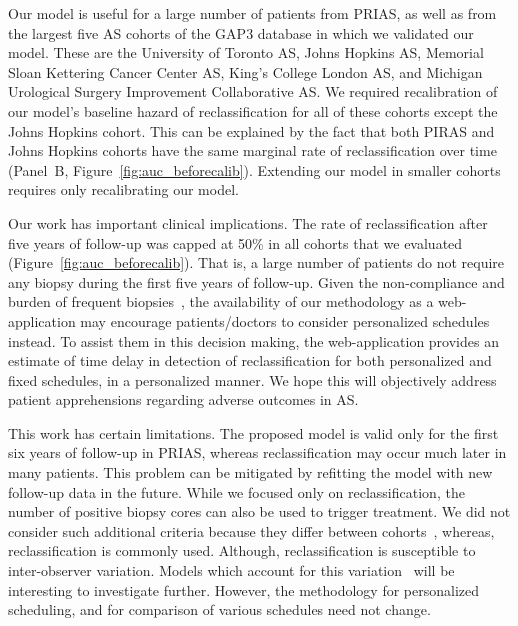 Our model is useful for a large number of patients from PRIAS, as well as from the largest five AS cohorts of the GAP3 database in which we validated our model. These are the University of Toronto AS, Johns Hopkins AS, Memorial Sloan Kettering Cancer Center AS, King's College London AS, and Michigan Urological Surgery Improvement Collaborative AS. We required recalibration of our model's baseline hazard of reclassification for all of these cohorts except the Johns Hopkins cohort. This can be explained by the fact that both PIRAS and Johns Hopkins cohorts have the same marginal rate of reclassification over time (Panel~B, Figure~\ref{fig:auc_beforecalib}). Extending our model in smaller cohorts requires only recalibrating our model.

Our work has important clinical implications. The rate of reclassification after five years of follow-up was capped at 50\% in all cohorts that we evaluated (Figure~\ref{fig:auc_beforecalib}). That is, a large number of patients do not require any biopsy during the first five years of follow-up. Given the non-compliance and burden of frequent biopsies~\citep{bokhorst2015compliance}, the availability of our methodology as a web-application may encourage patients/doctors to consider personalized schedules instead. To assist them in this decision making, the web-application provides an estimate of time delay in detection of reclassification for both personalized and fixed schedules, in a personalized manner. We hope this will objectively address patient apprehensions regarding adverse outcomes in AS.

This work has certain limitations. The proposed model is valid only for the first six years of follow-up in PRIAS, whereas reclassification may occur much later in many patients. This problem can be mitigated by refitting the model with new follow-up data in the future. While we focused only on reclassification, the number of positive biopsy cores can also be used to trigger treatment. We did not consider such additional criteria because they differ between cohorts~\citep{nieboer2018active}, whereas, reclassification is commonly used. Although, reclassification is susceptible to inter-observer variation. Models which account for this variation~\citep{coley2017prediction,balasubramanian2003estimation} will be interesting to investigate further. However, the methodology for personalized scheduling, and for comparison of various schedules need not change.

